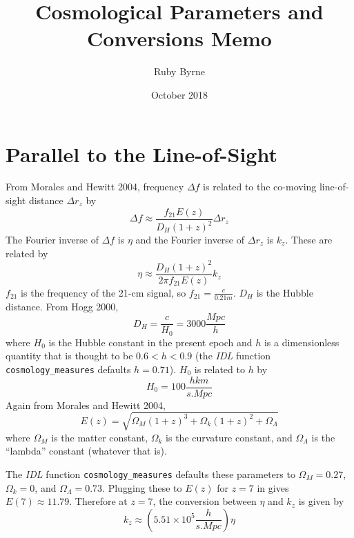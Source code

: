 \documentclass[a4paper,11pt]{article}
\title{Cosmological Parameters and Conversions Memo}
\author{Ruby Byrne}
\date{October 2018}
\begin{document}
\maketitle

\section{Parallel to the Line-of-Sight}

From Morales and Hewitt 2004, frequency $\Delta f$ is related to the co-moving line-of-sight distance $\Delta r_z$ by
\begin{equation}
\Delta f \approx \frac{f_{21} E(z)}{D_H (1+z)^2} \Delta r_z
\end{equation}
The Fourier inverse of $\Delta f$ is $\eta$ and the Fourier inverse of $\Delta r_z$ is $k_z$. These are related by
\begin{equation}
\eta \approx \frac{D_H (1+z)^2}{2 \pi f_{21} E(z)} k_z
\end{equation}
$f_{21}$ is the frequency of the 21-cm signal, so $f_{21} = \frac{c}{0.21 \si{m}}$. $D_H$ is the Hubble distance. From Hogg 2000,
\begin{equation}
D_H = \frac{c}{H_0} = 3000 \frac{\si{Mpc}}{h}
\end{equation}
where $H_0$ is the Hubble constant in the present epoch and $h$ is a dimensionless quantity that is thought to be $0.6 < h < 0.9$ (the \textit{IDL} function \texttt{cosmology\_measures} defaults $h=0.71$). $H_0$ is related to $h$ by
\begin{equation}
H_0 = 100 \frac{h\si{km}}{\si{s.Mpc}}
\end{equation}
Again from Morales and Hewitt 2004,
\begin{equation}
E(z) = \sqrt{\Omega_M(1+z)^3+\Omega_k(1+z)^2+\Omega_{\Lambda}}
\end{equation}
where $\Omega_M$ is the matter constant, $\Omega_k$ is the curvature constant, and $\Omega_{\Lambda}$ is the ``lambda'' constant (whatever that is). 

The \textit{IDL} function \texttt{cosmology\_measures} defaults these parameters to $\Omega_M=0.27$, $\Omega_k=0$, and $\Omega_{\Lambda}=0.73$. Plugging these to $E(z)$ for $z=7$ in gives $E(7) \approx 11.79$. Therefore at $z=7$, the conversion between $\eta$ and $k_z$ is given by
\begin{equation}
k_z \approx \left(5.51\times10^5 \frac{h}{\si{s.Mpc}}\right) \eta
\end{equation}
\end{document}
